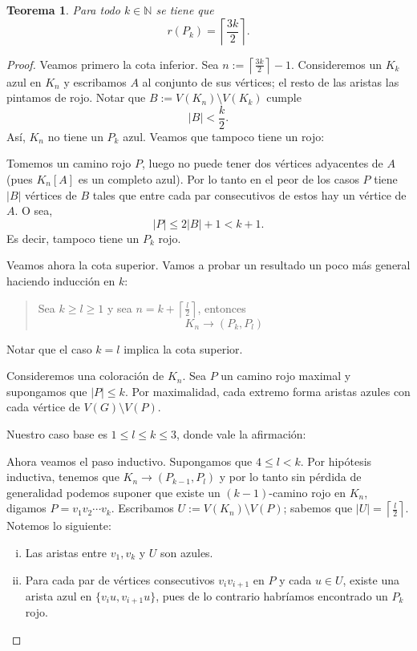 \documentclass[12pt]{report}
\theoremstyle{plain}
\newtheorem{theorem}{Teorema}[section]
\theoremstyle{definition}
\newcommand{\naturals}{\mathbb{N}}
\newcommand{\abs}[1]{\left \vert #1 \right \vert}
\newcommand{\ceil}[1]{\left\lceil #1  \right\rceil}
\begin{document}
\begin{theorem}
Para todo $k \in \naturals$ se tiene que
\[
    \boxed{r (P_k) = \ceil{\frac{3k}{2}}}.
\]
\end{theorem}
\begin{proof}
Veamos primero la cota inferior. Sea $n := \ceil{\frac{3k}{2}}-1$. Consideremos un $K_k$ azul en $K_n$ y escribamos $A$ al conjunto de sus vértices; el resto de las aristas las pintamos de rojo. Notar que $B:= V(K_n) \setminus V(K_k)$ cumple
\[
    \abs B < \frac{k}{2}.
\]
Así, $K_n$ no tiene un $P_k$ azul. Veamos que tampoco tiene un rojo:

Tomemos un camino rojo $P$, luego no puede tener dos vértices adyacentes de $A$ (pues $K_n [A]$ es un completo azul). Por lo tanto en el peor de los casos $P$ tiene $\abs B$ vértices de $B$ tales que entre cada par consecutivos de estos hay un vértice de $A$. O sea,
\[
    \abs{P} \leq 2\abs{B} + 1 < k + 1.
\]
Es decir, tampoco tiene un $P_k$ rojo.


\bigskip

Veamos ahora la cota superior. Vamos a probar un resultado un poco más general haciendo inducción en $k$:
\begin{quote}
Sea $k \geq l \geq 1$ y sea $n = k + \ceil{\frac{l}{2}}$, entonces
\[
    K_n \longrightarrow (P_k , P_l)
\]
\end{quote}
Notar que el caso $k = l$ implica la cota superior.

Consideremos una coloración de $K_n$. Sea $P$ un camino rojo maximal y supongamos que $\abs P \leq k$. Por maximalidad, cada extremo forma aristas azules con cada vértice de $V(G) \setminus V(P)$.

Nuestro caso base es $1 \leq l \leq k \leq 3$, donde vale la afirmación:


Ahora veamos el paso inductivo. Supongamos que $4 \leq l < k$. Por hipótesis inductiva, tenemos que $K_n \longrightarrow (P_{k-1}, P_l)$ y por lo tanto sin pérdida de generalidad podemos suponer que existe un $(k-1)$-camino rojo en $K_n$, digamos $P = v_1 v_2 \cdots v_k$. Escribamos $U := V(K_n) \setminus V(P)$; sabemos que $\abs U = \ceil{\frac l 2 }$. Notemos lo siguiente:
\begin{enumerate}[(i)]
\item Las aristas entre $v_1,v_k$ y $U$ son azules.
\item Para cada par de vértices consecutivos $v_i v_{i+1}$ en $P$ y cada $u \in U$, existe una arista azul en $\{v_i u, v_{i+1} u\}$, pues de lo contrario habríamos encontrado un $P_k$ rojo.
\end{enumerate}


\end{proof}
\end{document}
